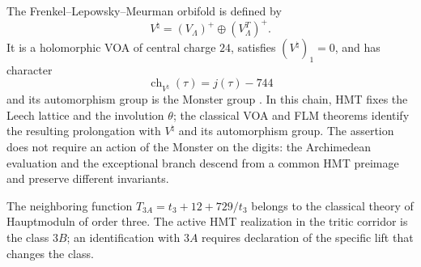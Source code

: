The Frenkel--Lepowsky--Meurman orbifold is defined by
\[
 V^\natural=(V_\Lambda)^+\oplus(V_\Lambda^T)^+.
\]
It is a holomorphic VOA of central charge \(24\), satisfies
\((V^\natural)_1=0\), and has character
\[
 \operatorname{ch}_{V^\natural}(\tau)=j(\tau)-744
\]
and its automorphism group is the Monster group
\cite{FLM1988,ConwayNorton1979,Borcherds1992}. In this chain, HMT fixes the
Leech lattice and the involution \(\theta\); the classical VOA and
FLM theorems identify the resulting prolongation with \(V^\natural\) and its
automorphism group. The assertion does not require an action of the Monster on the
digits: the Archimedean evaluation and the exceptional branch descend from a
common HMT preimage and preserve different invariants.

The neighboring function
\(T_{3A}=t_3+12+729/t_3\) belongs to the classical theory of Hauptmoduln of
order three. The active HMT realization in the tritic corridor is the class
\(3B\); an identification with \(3A\) requires declaration of the specific lift
that changes the class.
